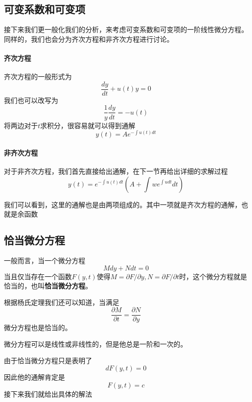 \documentclass[UTF8,12pt]{ctexart}
\numberwithin{equation}{section} %
\numberwithin{figure}{section}
\numberwithin{table}{section}
\begin{document}
	\subsection{可变系数和可变项}
	接下来我们更一般化我们的分析，来考虑可变系数和可变项的一阶线性微分方程。同样的，我们也会分为齐次方程和非齐次方程进行讨论。
	
	\paragraph{齐次方程}
	齐次方程的一般形式为
	\begin{equation}
		\frac{dy}{dt} + u(t)y = 0
	\end{equation}
	我们也可以改写为
	\begin{equation}
		\frac{1}{y} \frac{dy}{dt} = -u(t)
	\end{equation}
	将两边对于$t$求积分，很容易就可以得到通解
	\begin{equation}
		y(t) = Ae^{-\int u(t)dt}
	\end{equation}
	
	\paragraph{非齐次方程}
	对于非齐次方程，我们首先直接给出通解，在下一节再给出详细的求解过程
	\begin{equation}
		y(t) = e^{-\int u(t)dt}(A + \int we^{\int udt}dt)
	\end{equation}

	我们可以看到，这里的通解也是由两项组成的。其中一项就是齐次方程的通解，也就是余函数
	
	\subsection{恰当微分方程}
	一般而言，当一个微分方程
	\begin{equation}
		Mdy + Ndt = 0
	\end{equation}
	当且仅当存在一个函数$F(y,t)$使得$M = \partial F/\partial y,N = \partial F/\partial t$时，这个微分方程就是恰当的，也叫\textbf{恰当微分方程}。
	
	根据杨氏定理我们还可以知道，当满足
	\begin{equation}
		\frac{\partial M}{\partial t} = \frac{\partial N}{\partial y}
	\end{equation}
	微分方程也是恰当的。
	
	微分方程可以是线性或非线性的，但是他总是一阶和一次的。
	
	由于恰当微分方程只是表明了
	\begin{equation}
		dF(y,t) = 0
	\end{equation}
	因此他的通解肯定是
	\begin{equation}
		F(y,t) = c
	\end{equation}
	接下来我们就给出具体的解法
	
\end{document}
